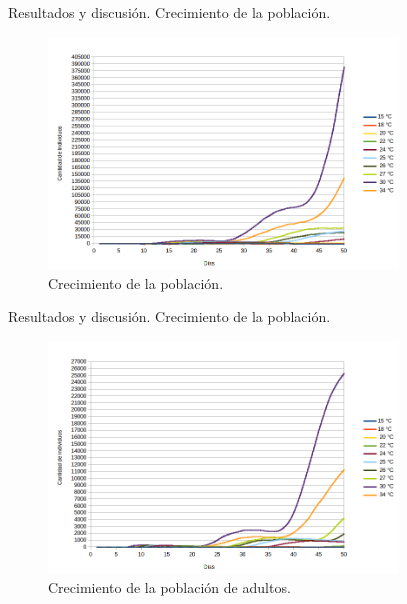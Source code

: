 
\begin{frame}[t]{Resultados y discusión. Crecimiento de la población.}
\begin{center}
    \begin{figure}
    \includegraphics[width=9.3cm]{../paper/graphics/evolucion-poblacion-all.png}
    \caption{Crecimiento de la población.}
    \end{figure}
\end{center}
\end{frame}

\begin{frame}[t]{Resultados y discusión. Crecimiento de la población.}
\begin{center}
    \begin{figure}
    \includegraphics[width=9.3cm]{../paper/graphics/evolucion-poblacion-adultos.png}
    \caption{Crecimiento de la población de adultos.}
    \end{figure}
\end{center}
\end{frame}


